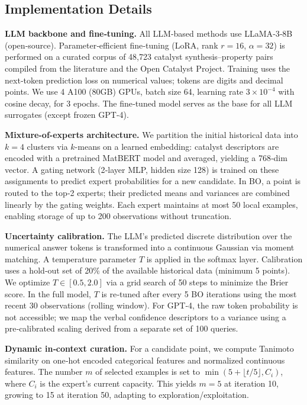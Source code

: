 \documentclass{article}
\begin{document}
\subsection{Implementation Details}
\textbf{LLM backbone and fine‑tuning.} All LLM‑based methods use LLaMA‑3‑8B (open‑source). Parameter‑efficient fine‑tuning (LoRA, rank \(r=16\), \(\alpha=32\)) is performed on a curated corpus of 48,723 catalyst synthesis–property pairs compiled from the literature and the Open Catalyst Project. Training uses the next‑token prediction loss on numerical values; tokens are digits and decimal points. We use 4 A100 (80GB) GPUs, batch size 64, learning rate \(3\times 10^{-4}\) with cosine decay, for 3 epochs. The fine‑tuned model serves as the base for all LLM surrogates (except frozen GPT‑4).

\textbf{Mixture-of-experts architecture.} We partition the initial historical data into \(k=4\) clusters via \(k\)-means on a learned embedding: catalyst descriptors are encoded with a pretrained MatBERT model and averaged, yielding a 768‑dim vector. A gating network (2‑layer MLP, hidden size 128) is trained on these assignments to predict expert probabilities for a new candidate. In BO, a point is routed to the top‑2 experts; their predicted means and variances are combined linearly by the gating weights. Each expert maintains at most 50 local examples, enabling storage of up to 200 observations without truncation.

\textbf{Uncertainty calibration.} The LLM’s predicted discrete distribution over the numerical answer tokens is transformed into a continuous Gaussian via moment matching. A temperature parameter \(T\) is applied in the softmax layer. Calibration uses a hold‑out set of 20\% of the available historical data (minimum 5 points). We optimize \(T \in [0.5, 2.0]\) via a grid search of 50 steps to minimize the Brier score. In the full model, \(T\) is re‑tuned after every 5 BO iterations using the most recent 30 observations (rolling window). For GPT‑4, the raw token probability is not accessible; we map the verbal confidence descriptors to a variance using a pre‑calibrated scaling derived from a separate set of 100 queries.

\textbf{Dynamic in‑context curation.} For a candidate point, we compute Tanimoto similarity on one‑hot encoded categorical features and normalized continuous features. The number \(m\) of selected examples is set to \(\min(5 + \lfloor t/5 \rfloor, C_i)\), where \(C_i\) is the expert’s current capacity. This yields \(m=5\) at iteration 10, growing to 15 at iteration 50, adapting to exploration/exploitation.
\end{document}
